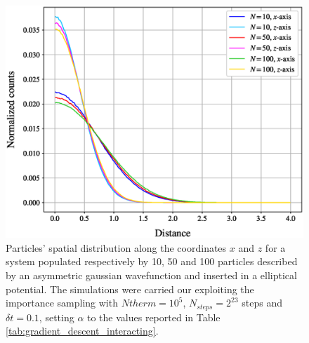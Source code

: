 \begin{figure}[H]
    \includegraphics[scale=0.37]{images/spatial_distribution_x_z.eps}
    \caption{Particles' spatial distribution along the coordinates $x$ and $z$ for a system populated respectively by 10, 50 and 100 particles described by an asymmetric gaussian wavefunction and inserted in a elliptical potential. The simulations were carried our exploiting the importance sampling with $N{therm}=10^5$, $N_{steps}=2^{23}$ steps and $\delta t =0.1$, setting $\alpha$ to the values reported in Table \ref{tab:gradient_descent_interacting}. }
    \label{fig:spatial_distribution_x_z}
\end{figure}